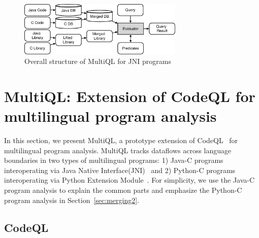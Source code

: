 \begin{figure}[t]
  \centering
  \vspace{2mm}
  \includegraphics[width=0.7\textwidth]{img/codeql.pdf}
  \caption{Overall structure of MultiQL for JNI programs}
  \label{fig:codeql}
\end{figure}

\section{MultiQL: Extension of CodeQL for multilingual program analysis}\label{sec:impl}
In this section, we present MultiQL, a prototype extension of
CodeQL~\cite{codeql} for multilingual program analysis.  MultiQL tracks
dataflows across language boundaries in two types of multilingual programs:
1) Java-C programs interoperating via Java Native Interface(JNI)~\cite{jnispec} and
2) Python-C programs interoperating via Python Extension Module~\cite{pyext}.
For simplicity, we use the Java-C program analysis to explain the common
parts and emphasize the Python-C program analysis in Section~\ref{sec:merging2}.




\subsection{CodeQL}

